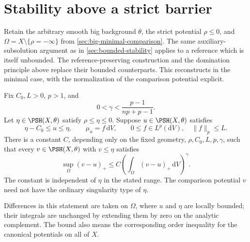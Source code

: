 \section{Stability above a strict barrier}
\label{sec:big-reference-stability}

Retain the arbitrary smooth big background $\theta$, the strict potential
$\rho\leq0$, and $\Omega=X\setminus\{\rho=-\infty\}$ from
\cref{sec:big-minimal-comparison}. The same auxiliary-subsolution argument
as in \cref{sec:bounded-stability} applies to a reference which is itself
unbounded. The reference-preserving construction and the domination
principle above replace their bounded counterparts. This reconstructs
\cite[Theorem~3.3 and Remark~3.4]{Dang26} in the minimal case, with the
normalization of the comparison potential explicit.

\begin{theorem}\label{thm:big-reference-one-sided-stability}
Fix $C_0,L>0$, $p>1$, and
\[
 0<\gamma<\frac{p-1}{np+p-1}.
\]
Let $\eta\in\PSH(X,\theta)$ satisfy $\rho\leq\eta\leq0$. Suppose
$u\in\PSH(X,\theta)$ satisfies
\[
 \eta-C_0\leq u\leq\eta,\qquad
 \mu_u=f\,\mathrm{d}V,\qquad 0\leq f\in L^p(\mathrm{d}V),
 \quad\|f\|_p\leq L.
\]
There is a constant $C$, depending only on the fixed geometry,
$\rho,C_0,L,p,\gamma$, such that every $v\in\PSH(X,\theta)$ with
$v\leq\eta$ satisfies
\begin{equation}\label{eq:big-reference-stability}
 \sup_\Omega(v-u)_+
 \leq C\left(\int_\Omega(v-u)_+\,\mathrm{d}V\right)^\gamma.
\end{equation}
The constant is independent of $\eta$ in the stated range. The comparison
potential $v$ need not have the ordinary singularity type of $\eta$.
\end{theorem}

Differences in this statement are taken on $\Omega$, where $u$ and $\eta$
are locally bounded; their integrals are unchanged by extending them by
zero on the analytic complement. The bound also means the corresponding
order inequality for the canonical potentials on all of $X$.

